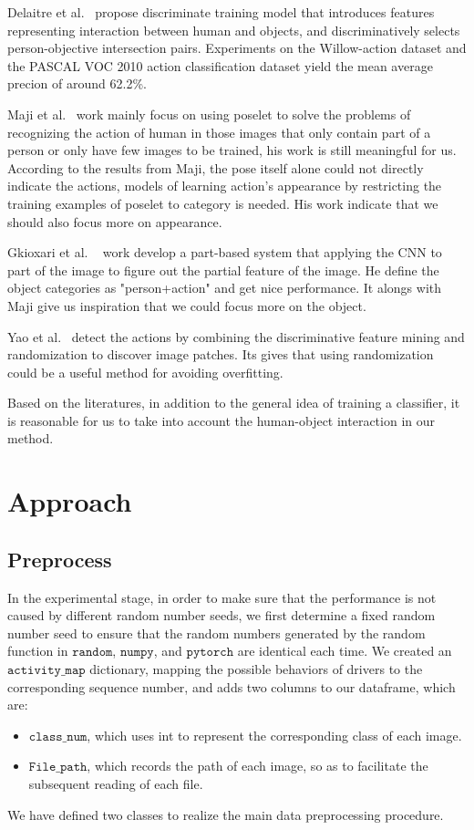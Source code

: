 \documentclass[final]{cvpr}
\begin{document}
    Delaitre et al.~\cite{person_obj} propose discriminate training model that introduces features representing interaction between human and objects, and discriminatively selects person-objective intersection pairs. Experiments on the Willow-action dataset and the PASCAL VOC 2010 action classification dataset yield the mean average precion of around 62.2\%.
    
    Maji et al.~\cite{5995631} work mainly focus on using poselet to solve the problems of recognizing the action of human in those images that only contain part of a person or only have few images to be trained, his work is still meaningful for us. According to the results from Maji, the pose itself alone could not directly indicate the actions, models of learning action's appearance by restricting the training examples of poselet to category is needed. His work indicate that we should also focus more on appearance.
    
    Gkioxari et al. ~\cite{7410641} work develop a part-based system that applying the CNN to part of the image to figure out the partial feature of the image. He define the object categories as "person+action" and get nice performance. It alongs with Maji give us inspiration that we could focus more on the object. 
    
    Yao et al.~\cite{5995368} detect the actions by combining the discriminative feature mining and randomization to discover image patches. Its gives that using randomization could be a useful method for avoiding overfitting.

    Based on the literatures, in addition to the general idea of training a classifier, it is reasonable for us to take into account the human-object interaction in our method.

\section{Approach}

\subsection{Preprocess}
In the experimental stage, in order to make sure that the performance is not caused by different random number seeds, we first determine a fixed random number seed to ensure that the random numbers generated by the random function in $\mathtt{random} $, $\mathtt{numpy} $, and $\mathtt{pytorch} $ are identical each time. We created an $\mathtt{activity\_map} $ dictionary, mapping the possible behaviors of drivers to the corresponding sequence number, and adds two columns to our dataframe, which are:\\
\begin{itemize}
\item  $\mathtt{class\_num}$, which uses int to represent the corresponding class of each image.
\item  $\mathtt{File\_path}$, which records the path of each image, so as to facilitate the subsequent reading of each file.
\end{itemize}
We have defined two classes to realize the main data preprocessing procedure.
\end{document}
